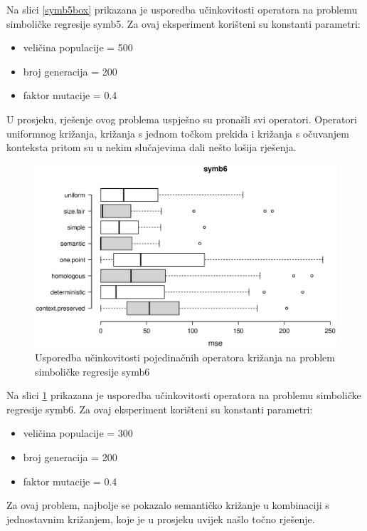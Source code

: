 Na slici \ref{symb5box} prikazana je usporedba učinkovitosti operatora na problemu simboličke regresije symb5. Za ovaj eksperiment korišteni su konstanti parametri:
\begin{itemize}
\item{veličina populacije = 500}
\item{broj generacija = 200}
\item{faktor mutacije = 0.4}
\end{itemize} 

U prosjeku, rješenje ovog problema uspješno su pronašli svi operatori. Operatori uniformnog križanja, križanja s jednom točkom prekida i križanja s očuvanjem konteksta pritom su u nekim slučajevima dali nešto lošija rješenja.


\begin{figure}[H]
	\centering
	\includegraphics[trim=0cm 4cm 0cm 0cm, scale=0.6]{./slike/boxPlots/symb6.eps}
	\caption{Usporedba učinkovitosti pojedinačnih operatora križanja na problem simboličke regresije symb6}
	\label{symb6box}
\end{figure}


Na slici \ref{symb6box} prikazana je usporedba učinkovitosti operatora na problemu simboličke regresije symb6. Za ovaj eksperiment korišteni su konstanti parametri:
\begin{itemize}
\item{veličina populacije = 300}
\item{broj generacija = 200}
\item{faktor mutacije = 0.4}
\end{itemize} 

Za ovaj problem, najbolje se pokazalo semantičko križanje u kombinaciji s jednostavnim križanjem, koje je u prosjeku uvijek našlo točno rješenje.



